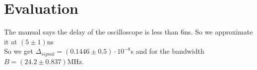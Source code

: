 \section{Evaluation}
The manual says the delay of the oscilloscope is less than $6$ns. So we approximate it at $(5\pm1)$ns\\
So we get $\Delta_{signal}=(0.1446\pm0.5)\cdot 10^{-8}$s and for the bandwidth $B=(24.2\pm0.837)$MHz.